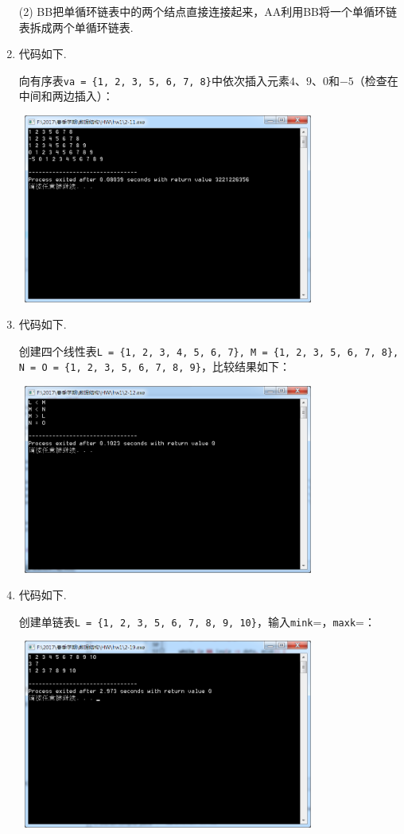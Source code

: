 \documentclass[11pt,a4paper]{ctexart}
\begin{document}
\begin{enumerate}
	(2) BB把单循环链表中的两个结点直接连接起来，AA利用BB将一个单循环链表拆成两个单循环链表.
	\item[2.11]
	代码如下.
	
	向有序表\texttt{va = \{1, 2, 3, 5, 6, 7, 8\}}中依次插入元素$4$、$9$、$0$和$-5$（检查在中间和两边插入）：
	
	\mbox{
		\includegraphics[width=0.75\textwidth]{hw1/screenshot/2-11}}
	\item[2.12]
	代码如下.
	
	创建四个线性表\texttt{L = \{1, 2, 3, 4, 5, 6, 7\}, M = \{1, 2, 3, 5, 6, 7, 8\}, N = O = \{1, 2, 3, 5, 6, 7, 8, 9\}}，比较结果如下：
	
	\mbox{
		\includegraphics[width=0.75\textwidth]{hw1/screenshot/2-12}}
	\item[2.19]
	代码如下.
	
	创建单链表\texttt{L = \{1, 2, 3, 5, 6, 7, 8, 9, 10\}}，输入\texttt{mink}=，\texttt{maxk}=：
	
	\mbox{
		\includegraphics[width=0.75\textwidth]{hw1/screenshot/2-19}}
	

\end{enumerate}
\end{document}
